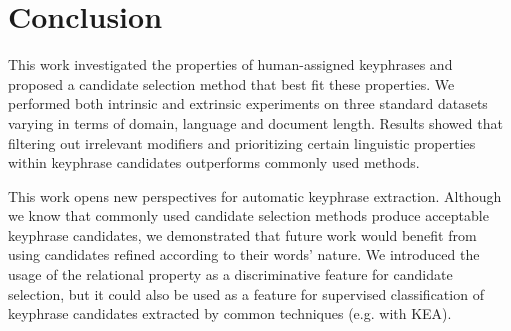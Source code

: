 \section{Conclusion}
\label{sec:conclusion}
    This work investigated the properties of human-assigned keyphrases and proposed a candidate selection method that best fit these properties.
    We performed both intrinsic and extrinsic experiments on three standard datasets varying in terms of domain, language and document length.
    Results showed that filtering out irrelevant modifiers and prioritizing certain linguistic properties within keyphrase candidates outperforms commonly used methods.
    
    This work opens new perspectives for automatic keyphrase extraction.
    Although we know that commonly used candidate selection methods produce acceptable keyphrase candidates, we demonstrated that future work would benefit from using candidates refined according to their words' nature.
    We introduced the usage of the relational property as a discriminative feature for candidate selection, but it could also be used as a feature for supervised classification of keyphrase candidates extracted by common techniques (e.g. with KEA).
